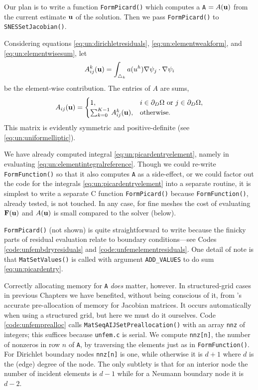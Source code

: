 Our plan is to write a function \texttt{FormPicard()} which computes a \pMat \texttt{A} $=A(\mathbf{u})$ from the current estimate $\mathbf{u}$ of the solution.  Then we pass \texttt{FormPicard()} to \texttt{SNESSetJacobian()}.

Considering equations \eqref{eq:un:dirichletresiduals}, \eqref{eq:un:elementweakform}, and \eqref{eq:un:elementwisesum}, let
\begin{equation}
A_{ij}^k(\mathbf{u}) = \int_{\triangle_k} a(u^h) \nabla\psi_j \cdot \nabla\psi_i \label{eq:un:picardentryelement}
\end{equation}
be the element-wise contribution.  The entries of $A$ are sums,
\begin{equation}
A_{ij}(\mathbf{u}) =  \begin{cases}
               1, & i \in \partial_D\Omega \text{ or } j \in \partial_D\Omega, \\
               \sum_{k=0}^{K-1} A_{ij}^k(\mathbf{u}), & \text{otherwise}.
               \end{cases} \label{eq:un:picardentry}
\end{equation}
This matrix is evidently symmetric and positive-definite (see \eqref{eq:un:uniformelliptic}).

We have already computed integral \eqref{eq:un:picardentryelement}, namely in evaluating \eqref{eq:un:elementintegralreference}.  Though we could re-write \texttt{FormFunction()} so that it also computes \texttt{A} as a side-effect, or we could factor out the code for the integrals \eqref{eq:un:picardentryelement} into a separate routine, it is simplest to write a separate C function \texttt{FormPicard()} because \texttt{FormFunction()}, already tested, is not touched.  In any case, for fine meshes the cost of evaluating $\mathbf{F}(\mathbf{u})$ and $A(\mathbf{u})$ is small compared to the solver (below).

\texttt{FormPicard()} (not shown) is quite straightforward to write because the finicky parts of residual evaluation relate to boundary conditions---see Codes \ref{code:unfembdryresiduals} and \ref{code:unfemelementresiduals}.  One detail of note is that \texttt{MatSetValues()} is called with argument \texttt{ADD\_VALUES} to do sum \eqref{eq:un:picardentry}.

Correctly allocating memory for \pMat \texttt{A} \emph{does} matter, however.  In structured-grid cases in previous Chapters we have benefited, without being conscious of it, from \PETSc's accurate pre-allocation of memory for Jacobian matrices.  It occurs automatically when using a \pDMDA structured grid, but here we must do it ourselves.  Code \ref{code:unfemprealloc} calls \texttt{MatSeqAIJSetPreallocation()} with an array \texttt{nnz} of integers; this suffices because \texttt{unfem.c} is serial.  We compute \texttt{nnz[n]}, the number of nonzeros in row $n$ of \texttt{A}, by traversing the elements just as in \texttt{FormFunction()}.  For Dirichlet boundary nodes \texttt{nnz[n]} is one, while otherwise it is $d+1$ where $d$ is the (edge) degree of the node.  The only subtlety is that for an interior node the number of incident elements is $d-1$ while for a Neumann boundary node it is $d-2$.

